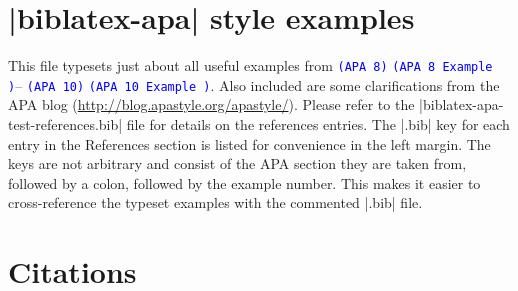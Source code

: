 \documentclass[paper=a4]{article}
\newcommand\apa[2][]{\ifthenelse{\equal{#1}{}}%
                       {\textcolor{blue}{\texttt{(APA #2)}}}%
                       {\textcolor{blue}{\texttt{(APA #2 Example #1)}}}}
\begin{document}
\section*{|biblatex-apa| style examples}
This file typesets just about all useful examples from \apa{8}--\apa{10}.
Also included are some clarifications from the APA blog
(\url{http://blog.apastyle.org/apastyle/}). Please refer to the
|biblatex-apa-test-references.bib| file for details on the references
entries. The |.bib| key for each entry in the References section is listed
for convenience in the left margin. The keys are not arbitrary and consist
of the APA section they are taken from, followed by a colon,
followed by the example number. This makes it easier to cross-reference the
typeset examples with the commented |.bib| file.

\section*{Citations}
\end{document}
